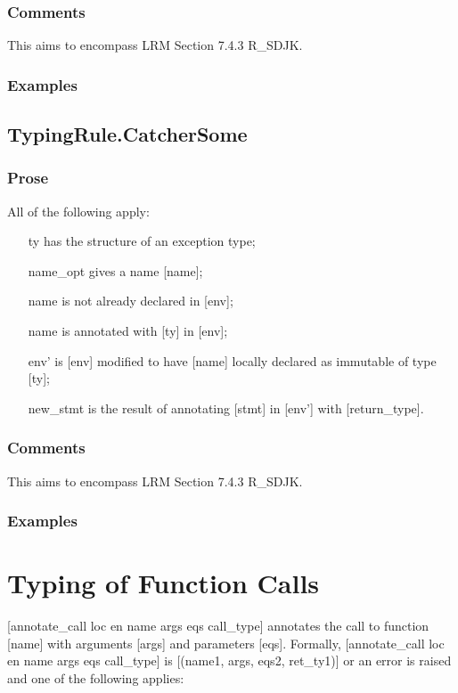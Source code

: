 \documentclass{book}
\begin{document}
    \subsubsection{Comments}
    This aims to encompass LRM Section 7.4.3 R\_SDJK.

    \subsubsection{Examples}


\subsection{TypingRule.CatcherSome}

    \subsubsection{Prose}
    All of the following apply:
   \begin{itemize}
   \item [ty] has the structure of an exception type;
   \item [name\_opt] gives a name [name];
   \item [name] is not already declared in [env];
   \item [name] is annotated with [ty] in [env];
   \item [env'] is [env] modified to have [name] locally declared as immutable of type [ty];
   \item [new\_stmt] is the result of annotating [stmt] in [env'] with [return\_type].
   \end{itemize}

    \subsubsection{Comments}
    This aims to encompass LRM Section 7.4.3 R\_SDJK.

    \subsubsection{Examples}


\section{Typing of Function Calls}
[annotate\_call loc en name args eqs call\_type] annotates the call to function
[name] with arguments [args] and parameters [eqs]. Formally, [annotate\_call loc
en name args eqs call\_type] is [(name1, args, eqs2, ret\_ty1)] or an error is
raised and one of the following applies:
\end{document}
